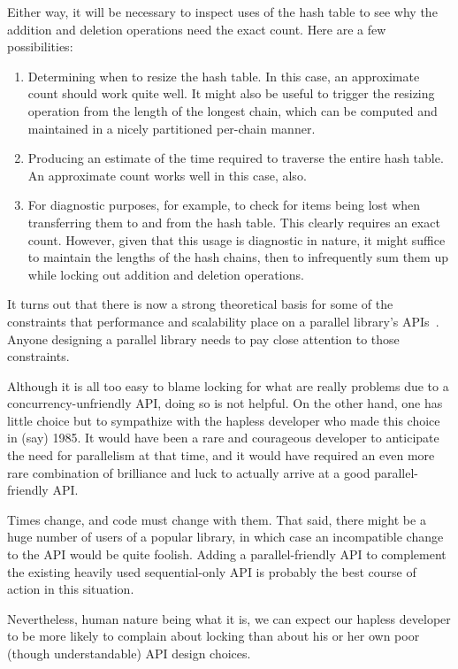 Either way, it will be necessary to inspect uses of the hash table to see
why the addition and deletion operations need the exact count.
Here are a few possibilities:

\begin{enumerate}
\item	Determining when to resize the hash table.
	In this case, an approximate count should work quite well.
	It might also be useful to trigger the resizing operation from
	the length of the longest chain, which can be computed and
	maintained in a nicely partitioned per-chain manner.
\item	Producing an estimate of the time required to traverse the
	entire hash table.
	An approximate count works well in this case, also.
\item	For diagnostic purposes, for example, to check for items being
	lost when transferring them to and from the hash table.
	This clearly requires an exact count.
	However, given that this usage is diagnostic in nature, it might
	suffice to maintain the lengths of the hash chains, then to
	infrequently sum them
	up while locking out addition and deletion operations.
\end{enumerate}

It turns out that there is now a strong theoretical basis for some of the
constraints that performance and scalability place on a parallel library's
APIs~\cite{HagitAttiya2011LawsOfOrder,PaulEMcKenney2011SNC}.
Anyone designing a parallel library needs to pay close attention to
those constraints.

Although it is all too easy to blame locking for what are really problems
due to a concurrency-unfriendly API, doing so is not helpful.
On the other hand, one has little choice but to sympathize with the
hapless developer who made this choice in (say) 1985.
It would have been a rare and courageous developer to anticipate the
need for parallelism at that time, and it would have required an
even more rare combination of brilliance and luck to actually arrive
at a good parallel-friendly API.

Times change, and code must change with them.
That said, there might be a huge number of users of a popular library,
in which case an incompatible change to the API would be quite foolish.
Adding a parallel-friendly API to complement the existing heavily used
sequential-only API is probably the best course of action in this
situation.

Nevertheless, human nature being what it is, we can expect our hapless
developer to be more likely to complain about locking than about his
or her own poor (though understandable) API design choices.

